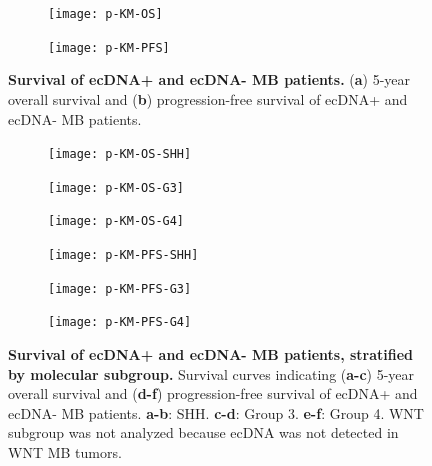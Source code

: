 \begin{figure}[!h]
    \centering
    \begin{subfigure}{0.49\textwidth}
        \centering
        \texttt{[image: p-KM-OS]}
        \caption{}
        \label{subfig:os}
    \end{subfigure}
    \begin{subfigure}{0.49\textwidth}
        \texttt{[image: p-KM-PFS]}
        \caption{}
        \label{subfig:pfs}
    \end{subfigure}
    \caption[Survival of ecDNA+ and ecDNA- MB patients.]{\textbf{Survival of ecDNA+ and ecDNA- MB patients.} (\textbf{a}) 5-year overall survival and (\textbf{b}) progression-free survival of ecDNA+ and ecDNA- MB patients.}
    \label{fig:km}
\end{figure}

\begin{figure}[!h]
    \centering
    \begin{subfigure}{0.32\textwidth}
        \centering
        \texttt{[image: p-KM-OS-SHH]}
        \caption{}
        \label{subfig:os-shh}
    \end{subfigure}
    \begin{subfigure}{0.32\textwidth}
        \texttt{[image: p-KM-OS-G3]}
        \caption{}
        \label{subfig:os-g3}
    \end{subfigure}
    \begin{subfigure}{0.32\textwidth}
        \texttt{[image: p-KM-OS-G4]}
        \caption{}
        \label{subfig:os-g4}
    \end{subfigure}
        \begin{subfigure}{0.32\textwidth}
        \centering
        \texttt{[image: p-KM-PFS-SHH]}
        \caption{}
        \label{subfig:pfs-shh}
    \end{subfigure}
    \begin{subfigure}{0.32\textwidth}
        \texttt{[image: p-KM-PFS-G3]}
        \caption{}
        \label{subfig:pfs-g3}
    \end{subfigure}
    \begin{subfigure}{0.32\textwidth}
        \texttt{[image: p-KM-PFS-G4]}
        \caption{}
        \label{subfig:pfs-g4}
    \end{subfigure}
    \caption[Survival of ecDNA+ and ecDNA- MB patients, stratified by molecular subgroup.]{\textbf{Survival of ecDNA+ and ecDNA- MB patients, stratified by molecular subgroup.} Survival curves indicating (\textbf{a-c}) 5-year overall survival and (\textbf{d-f}) progression-free survival of ecDNA+ and ecDNA- MB patients. \textbf{a-b}: SHH. \textbf{c-d}: Group 3. \textbf{e-f}: Group 4. WNT subgroup was not analyzed because ecDNA was not detected in WNT MB tumors.}
    \label{fig:km-subgroup}
\end{figure}

